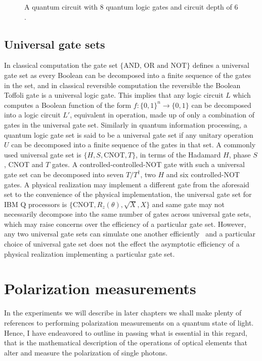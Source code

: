 \begin{figure}
	\centering
	\caption{A quantum circuit with $8$ quantum logic gates and circuit depth of $6$.}
\end{figure}

\subsection{Universal gate sets}
\noindent
In classical computation the gate set $\{\text{AND, OR and NOT}\}$ defines a universal gate set as every Boolean can be decomposed into a finite sequence of the gates in the set, and in classical reversible computation the reversible the Boolean Toffoli gate is a universal logic gate. This implies that any logic circuit $L$ which computes a Boolean function of the form $f: \{0,1\}^n \to \{0,1\}$ can be decomposed into a logic circuit $L'$, equivalent in operation, made up of only a combination of gates in the universal gate set. Similarly in quantum information processing, a quantum logic gate set is said to be a universal gate set if any unitary operation $U$ can be decomposed into a finite sequence of the gates in that set. A commonly used universal gate set is $\{H, S, \text{CNOT}, T\}$, in terms of the Hadamard  $H$, phase  $S$, CNOT  and $T$ gates. A controlled-controlled-NOT gate with such a universal gate set can be decomposed into seven $T/T^{\dagger}$, two $H$ and six controlled-NOT gates. A physical realization may implement a different gate from the aforesaid set to the convenience of the physical implementation, \ie the universal gate set for IBM Q processors is $\{\text{CNOT}, R_z\left(\theta\right) ,\sqrt{X}, X\}$ and same gate may not necessarily decompose into the same number of gates across universal gate sets, which may raise concerns over the efficiency of a particular gate set. However, any two universal gate sets can simulate one another efficiently~\cite{Dawson_2005} and a particular choice of universal gate set does not the effect the asymptotic efficiency of a physical realization implementing a particular gate set.

\section{Polarization measurements}
In the experiments we will describe in later chapters we shall make plenty of references to performing polarization measurements on a quantum state of light. Hence, I have endeavored to outline in passing what is essential in this regard, that is the mathematical description of the operations of optical elements that alter and measure the polarization of single photons. 



